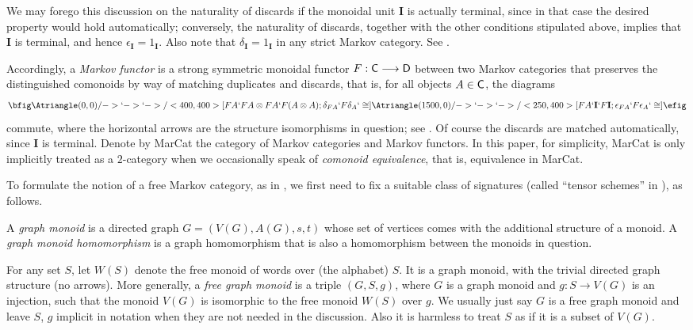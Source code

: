 \documentclass[12pt]{amsart}
\theoremstyle{plain}
\theoremstyle{definition}
\theoremstyle{remark}
\numberwithin{equation}{section}
\theoremstyle{plain}
\newcommand{\0}{\emptyset}
\newcommand{\fun}{\longrightarrow}
\newcommand{\cat}[1]{\textup{\textsf{#1}}}
\newcommand{\memph}[1]{{\color{magenta}\emph{#1}}}
\newcommand{\moi}{\mathbf{I}}
\begin{document}
We may forego this discussion on the naturality of discards if the monoidal unit $\moi$ is actually terminal, since in that case the desired property would hold automatically; conversely, the naturality of discards, together with the other conditions stipulated above, implies that  $\moi$ is terminal, and hence $\epsilon_\moi  = 1_\moi$. Also note that $\delta_\moi = 1_\moi$  in any strict Markov category. See \cite[Remark~2.3]{fritz2020synthetic}.

Accordingly, a \memph{Markov functor} is a strong symmetric monoidal functor  $F : \cat C \fun \cat D$ between two Markov categories that preserves the distinguished  comonoids by way of matching duplicates and discards, that is, for all objects $A \in \cat C$, the diagrams
\begin{equation*}
  \bfig
      \Atriangle(0,0)/->`->`->/<400,400>[FA`FA \otimes FA`F(A \otimes A); \delta_{FA}`F\delta_A`\cong]
      \Atriangle(1500,0)/->`->`->/<250,400>[FA`\moi`F \moi; \epsilon_{FA}`F\epsilon_A`\cong]
  \efig
\end{equation*}
commute, where  the horizontal arrows are the structure isomorphisms in question; see \cite[Definition~10.14]{fritz2020synthetic}. Of course the discards are matched automatically, since $\moi$ is terminal. Denote by \cat{MarCat} the category of Markov categories and Markov functors. In this paper, for simplicity,  \cat{MarCat} is only implicitly treated as a $2$-category when we occasionally speak of \memph{comonoid equivalence}, that is, equivalence in \cat{MarCat}.

To formulate the notion of a free Markov category, as in \cite{selinger2010survey}, we first need to fix a suitable class of signatures (called ``tensor schemes'' in \cite{joyal1991geometry}), as follows.

A \memph{graph monoid} is a directed graph $G = (V(G), A(G), s, t)$ whose set of vertices comes with the additional structure of a monoid. A \memph{graph monoid homomorphism} is a graph homomorphism that is also a homomorphism between the monoids in question.

For any set $S$, let $W(S)$ denote the free monoid of words over (the alphabet) $S$. It is a graph monoid, with the trivial directed graph structure (no arrows). More generally, a \memph{free graph monoid} is a triple $(G, S, g)$, where $G$ is a graph monoid and $g : S \fun V(G)$ is an injection, such that the monoid $V(G)$ is isomorphic to the free monoid $W(S)$ over $g$. We usually just say $G$ is a free graph monoid and leave $S$, $g$ implicit in notation when they are not needed in the discussion. Also it is harmless to treat $S$ as if it is a subset of $V(G)$.
\end{document}
